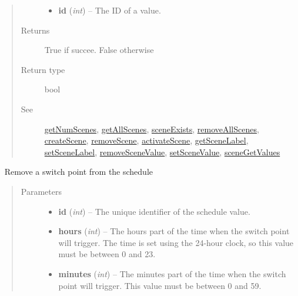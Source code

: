 \documentclass[letterpaper,10pt,english]{sphinxmanual}
\begin{document}
\begin{fulllineitems}
\begin{fulllineitems}
\begin{quote}
\begin{description}
\begin{itemize}
\item {} 
\textbf{id} (\emph{int}) -- The ID of a value.

\end{itemize}

\item[{Returns}] \leavevmode
True if succee. False otherwise

\item[{Return type}] \leavevmode
bool

\item[{See}] \leavevmode
{\hyperref[libopenzwave:getnumscenes]{getNumScenes}}, {\hyperref[libopenzwave:getallscenes]{getAllScenes}}, {\hyperref[libopenzwave:sceneexists]{sceneExists}}, {\hyperref[libopenzwave:removeallscenes]{removeAllScenes}}, {\hyperref[libopenzwave:createscene]{createScene}}, {\hyperref[libopenzwave:removescene]{removeScene}}, {\hyperref[libopenzwave:activatescene]{activateScene}}, {\hyperref[libopenzwave:getscenelabel]{getSceneLabel}}, {\hyperref[libopenzwave:setscenelabel]{setSceneLabel}}, {\hyperref[libopenzwave:removescenevalue]{removeSceneValue}}, {\hyperref[libopenzwave:setscenevalue]{setSceneValue}}, {\hyperref[libopenzwave:scenegetvalues]{sceneGetValues}}

\end{description}\end{quote}

\end{fulllineitems}


\begin{fulllineitems}
\label{libopenzwave:libopenzwave.PyManager.removeSwitchPoint}~\label{libopenzwave:removeswitchpoint}
Remove a switch point from the schedule
\begin{quote}\begin{description}
\item[{Parameters}] \leavevmode\begin{itemize}
\item {} 
\textbf{id} (\emph{int}) -- The unique identifier of the schedule value.

\item {} 
\textbf{hours} (\emph{int}) -- The hours part of the time when the switch point will trigger.  The time is set using the 24-hour clock, so this value must be between 0 and 23.

\item {} 
\textbf{minutes} (\emph{int}) -- The minutes part of the time when the switch point will trigger.  This value must be between 0 and 59.


\end{itemize}
\end{description}
\end{quote}
\end{fulllineitems}
\end{fulllineitems}
\end{document}

